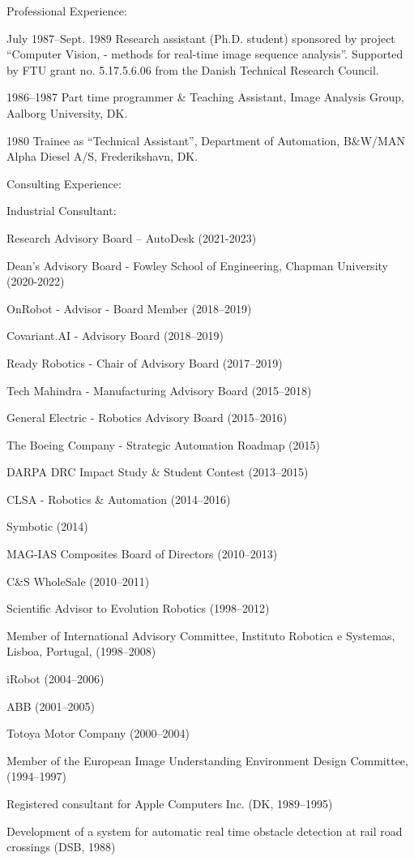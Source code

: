 \documentclass{article}
\newenvironment{sublist}{%
  \begin{list}{}{%
      \setlength{\itemsep}{0em}\setlength{\parsep}{0em}%
      \setlength{\topsep}{0em}\setlength{\parskip}{0em}%
    }%
}%
{ \end{list} }
\begin{document}
\begin{cv}
\begin{cvlist}{Professional Experience:}
\item[July 1987--Sept. 1989] Research assistant (Ph.D. student) sponsored
  by project ``Computer Vision, - methods for real-time image
  sequence analysis''. Supported by FTU grant no. 5.17.5.6.06 from the
  Danish Technical Research Council.

\item[1986--1987] Part time programmer \& Teaching Assistant,
  Image Analysis Group, Aalborg University, DK.

\item[1980] Trainee as ``Technical Assistant'', Department of
  Automation, B\&W/MAN Alpha Diesel A/S, Frederikshavn, DK.
\end{cvlist}

\begin{cvlist}{Consulting Experience:}
\item Industrial Consultant:
  \begin{sublist}
  \item Research Advisory Board -- AutoDesk (2021-2023)
  \item Dean's Advisory Board - Fowley School of Engineering, Chapman University (2020-2022)
  \item OnRobot - Advisor - Board Member (2018--2019)
  \item Covariant.AI - Advisory Board (2018--2019)
  \item Ready Robotics - Chair of Advisory Board (2017--2019)
  \item Tech Mahindra - Manufacturing Advisory Board (2015--2018)
  \item General Electric - Robotics Advisory Board (2015--2016)
  \item The Boeing Company - Strategic Automation Roadmap (2015)
  \item DARPA DRC Impact Study \& Student Contest (2013--2015)
  \item CLSA - Robotics \& Automation (2014--2016)
  \item Symbotic (2014)
  \item MAG-IAS Composites Board of Directors (2010--2013)
  \item C\&S WholeSale (2010--2011)
  \item Scientific Advisor to Evolution Robotics (1998--2012)
  \item Member of International Advisory Committee, Instituto Robotica e
    Systemas, Lisboa, Portugal, (1998--2008)
  \item iRobot (2004--2006)
  \item ABB (2001--2005)
  \item Totoya Motor Company (2000--2004)
  \item Member of the European Image Understanding Environment Design
    Committee, (1994--1997)
  \item Registered consultant for Apple Computers Inc. (DK, 1989--1995)
  \item Development of a system for automatic real time obstacle
    detection at rail road crossings (DSB, 1988)
  \end{sublist}
\end{cvlist}


\end{cv}
\end{document}
